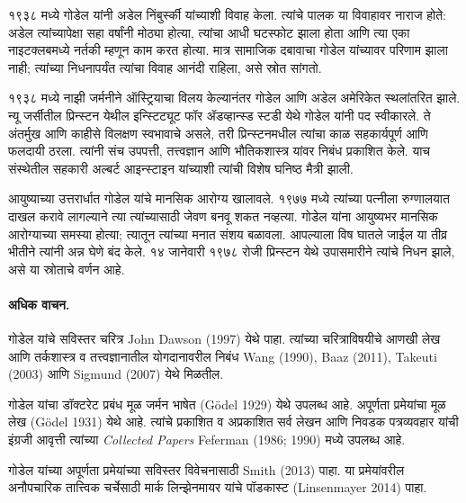 १९३८ मध्ये गोडेल यांनी अडेल निंबुर्स्की यांच्याशी विवाह केला. त्यांचे पालक या विवाहावर नाराज होते: अडेल त्यांच्यापेक्षा सहा वर्षांनी मोठ्या होत्या, त्यांचा आधी घटस्फोट झाला होता आणि त्या एका नाइटक्लबमध्ये नर्तकी म्हणून काम करत होत्या. मात्र सामाजिक दबावाचा गोडेल यांच्यावर परिणाम झाला नाही; त्यांच्या निधनापर्यंत त्यांचा विवाह आनंदी राहिला, असे स्रोत सांगतो.

१९३८ मध्ये नाझी जर्मनीने ऑस्ट्रियाचा विलय केल्यानंतर गोडेल आणि अडेल अमेरिकेत स्थलांतरित झाले. न्यू जर्सीतील प्रिन्स्टन येथील इन्स्टिट्यूट फॉर ॲडव्हान्स्ड स्टडी येथे गोडेल यांनी पद स्वीकारले. ते अंतर्मुख आणि काहीसे विलक्षण स्वभावाचे असले, तरी प्रिन्स्टनमधील त्यांचा काळ सहकार्यपूर्ण आणि फलदायी ठरला. त्यांनी संच उपपत्ती, तत्त्वज्ञान आणि भौतिकशास्त्र यांवर निबंध प्रकाशित केले. याच संस्थेतील सहकारी अल्बर्ट आइन्स्टाइन यांच्याशी त्यांची विशेष घनिष्ठ मैत्री झाली.

आयुष्याच्या उत्तरार्धात गोडेल यांचे मानसिक आरोग्य खालावले. १९७७ मध्ये त्यांच्या पत्नीला रुग्णालयात दाखल करावे लागल्याने त्या त्यांच्यासाठी जेवण बनवू शकत नव्हत्या. गोडेल यांना आयुष्यभर मानसिक आरोग्याच्या समस्या होत्या; त्यातून त्यांच्या मनात संशय बळावला. आपल्याला विष घातले जाईल या तीव्र भीतीने त्यांनी अन्न घेणे बंद केले. १४ जानेवारी १९७८ रोजी प्रिन्स्टन येथे उपासमारीने त्यांचे निधन झाले, असे या स्रोताचे वर्णन आहे.

\paragraph{अधिक वाचन.}
गोडेल यांचे सविस्तर चरित्र John Dawson (1997) येथे पाहा. त्यांच्या चरित्राविषयीचे आणखी लेख आणि तर्कशास्त्र व तत्त्वज्ञानातील योगदानावरील निबंध Wang (1990), Baaz (2011), Takeuti (2003) आणि Sigmund (2007) येथे मिळतील.

गोडेल यांचा डॉक्टरेट प्रबंध मूळ जर्मन भाषेत (G\"odel 1929) येथे उपलब्ध आहे. अपूर्णता प्रमेयांचा मूळ लेख (G{\"{o}}del 1931) येथे आहे. त्यांचे प्रकाशित व अप्रकाशित सर्व लेखन आणि निवडक पत्रव्यवहार यांची इंग्रजी आवृत्ती त्यांच्या \emph{Collected Papers} Feferman (1986; 1990) मध्ये उपलब्ध आहे.

गोडेल यांच्या अपूर्णता प्रमेयांच्या सविस्तर विवेचनासाठी Smith (2013) पाहा. या प्रमेयांवरील अनौपचारिक तात्त्विक चर्चेसाठी मार्क लिन्झेनमायर यांचे पॉडकास्ट (Linsenmayer 2014) पाहा.













